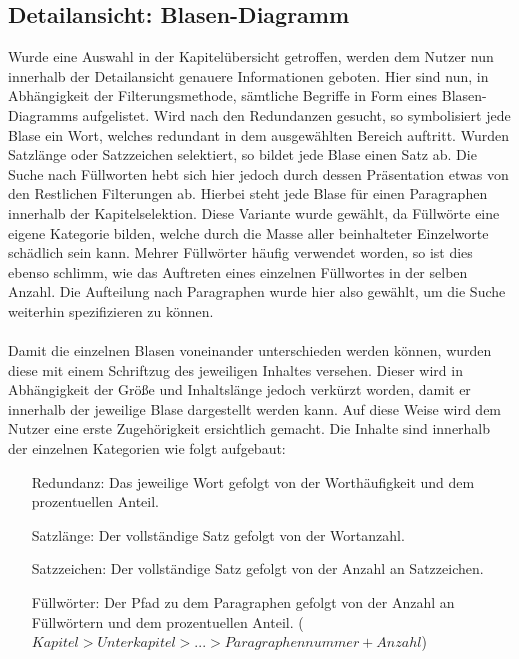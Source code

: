 \subsection{Detailansicht: Blasen-Diagramm}
Wurde eine Auswahl in der Kapitel\"ubersicht getroffen, werden dem Nutzer nun innerhalb der Detailansicht genauere Informationen geboten. Hier sind nun, in Abh\"angigkeit der Filterungsmethode, s\"amtliche Begriffe in Form eines Blasen-Diagramms aufgelistet. Wird nach den Redundanzen gesucht, so symbolisiert jede Blase ein Wort, welches redundant in dem ausgew\"ahlten Bereich auftritt. Wurden Satzl\"ange oder Satzzeichen selektiert, so bildet jede Blase einen Satz ab. Die Suche nach F\"ullworten hebt sich hier jedoch durch dessen Pr\"asentation etwas von den Restlichen Filterungen ab. Hierbei steht jede Blase f\"ur einen Paragraphen innerhalb der Kapitelselektion. Diese Variante wurde gew\"ahlt, da F\"ullw\"orte eine eigene Kategorie bilden, welche durch die Masse aller beinhalteter Einzelworte sch\"adlich sein kann. Mehrer F\"ullw\"orter h\"aufig verwendet worden, so ist dies ebenso schlimm, wie das Auftreten eines einzelnen F\"ullwortes in der selben Anzahl. Die Aufteilung nach Paragraphen wurde hier also gew\"ahlt, um die Suche weiterhin spezifizieren zu k\"onnen.\\
\\
Damit die einzelnen Blasen voneinander unterschieden werden k\"onnen, wurden diese mit einem Schriftzug des jeweiligen Inhaltes versehen. Dieser wird in Abh\"angigkeit der Gr\"o{\ss}e und Inhaltsl\"ange jedoch verk\"urzt worden, damit er innerhalb der jeweilige Blase dargestellt werden kann. Auf diese Weise wird dem Nutzer eine erste Zugeh\"origkeit ersichtlich gemacht. Die Inhalte sind innerhalb der einzelnen Kategorien wie folgt aufgebaut: \\
\begin{center} 
   \begin{varwidth}{2in} 
      \begin{itemize} 
         \item[Redundanz:] Das jeweilige Wort gefolgt von der Worth\"aufigkeit und dem prozentuellen Anteil. 
		 \item[Satzl\"ange:] Der vollst\"andige Satz gefolgt von der Wortanzahl.
		 \item[Satzzeichen:] Der vollst\"andige Satz gefolgt von der Anzahl an Satzzeichen.
		 \item[F\"ullw\"orter:] Der Pfad zu dem Paragraphen gefolgt von der Anzahl an F\"ullw\"ortern und dem prozentuellen Anteil. (\(Kapitel  >  Unterkapitel  >  . . .  >  Paragraphennummer + Anzahl\))
      \end{itemize} 
   \end{varwidth} 
\end{center}
